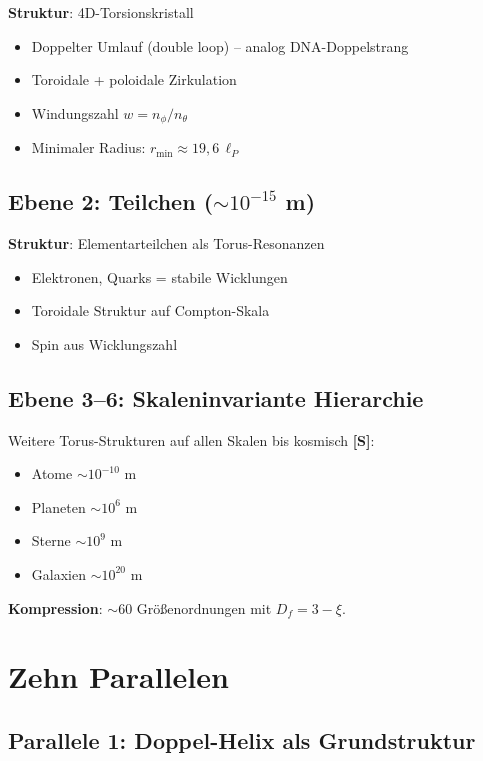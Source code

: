 	\textbf{Struktur}: 4D-Torsionskristall
	\begin{itemize}
		\item Doppelter Umlauf (double loop) -- analog DNA-Doppelstrang
		\item Toroidale + poloidale Zirkulation
		\item Windungszahl $w = n_\phi / n_\theta$
		\item Minimaler Radius: $r_{\min} \approx 19{,}6\,\ell_P$
	\end{itemize}

	\subsection{Ebene 2: Teilchen ($\sim 10^{-15}$ m)}

	\textbf{Struktur}: Elementarteilchen als Torus-Resonanzen
	\begin{itemize}
		\item Elektronen, Quarks = stabile Wicklungen
		\item Toroidale Struktur auf Compton-Skala
		\item Spin aus Wicklungszahl
	\end{itemize}

	\subsection{Ebene 3--6: Skaleninvariante Hierarchie}

	Weitere Torus-Strukturen auf allen Skalen bis kosmisch \textbf{[S]}:
	\begin{itemize}
		\item Atome $\sim 10^{-10}$ m
		\item Planeten $\sim 10^{6}$ m  
		\item Sterne $\sim 10^{9}$ m
		\item Galaxien $\sim 10^{20}$ m
	\end{itemize}

	\textbf{Kompression}: $\sim 60$ Größenordnungen mit $D_f = 3-\xi$.

	\section{Zehn Parallelen}

	\subsection{Parallele 1: Doppel-Helix als Grundstruktur}

